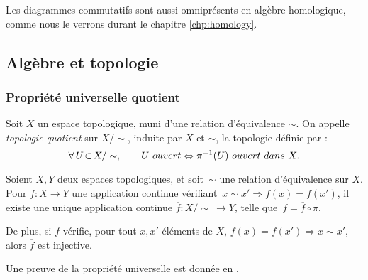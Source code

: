 Les diagrammes commutatifs sont aussi omniprésents en algèbre homologique, comme nous le verrons durant le chapitre \ref{chp:homology}.

\subsection{Algèbre et topologie}

\subsubsection{Propriété universelle quotient}

\begin{definition}
Soit $X$ un espace topologique, muni d'une relation d'équivalence $\sim$. On appelle \emph{topologie quotient} sur $X/\!\sim$, induite par $X$ et $\sim$, la topologie définie par :\[\forall\, U\!\subset\! X/\sim,\qquad U\ ouvert\Leftrightarrow\pi\inv(U)\ ouvert\ dans \ X.\]
\end{definition}

\begin{theorem}\label{th:quotient}
Soient $X,Y$ deux espaces topologiques, et soit~$\sim$ une relation d'équivalence sur $X$. Pour $f:X\to Y$ une application continue vérifiant~${x\sim x'\Rightarrow f(x)=f(x')}$, il existe une unique application continue $\overline{f}:X/\!\sim\ \longrightarrow Y$, telle que~$f=\overline{f}\circ \pi$.

De plus, si $f$ vérifie, pour tout $x,x'$ éléments de $X$, $f(x)=f(x')\Rightarrow x\sim x'$, alors $\overline{f}$ est injective.
\end{theorem}

Une preuve de la propriété universelle est donnée en \cite{Homeo-article}.
